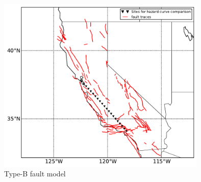 \begin{figure}
\centering
\includegraphics[width=10cm]{./qareport/pictures/bFault_stitched_D2pt1_GR0.pdf}
\caption{Type-B fault model}
\label{fig:type_b_fault}
\end{figure}

